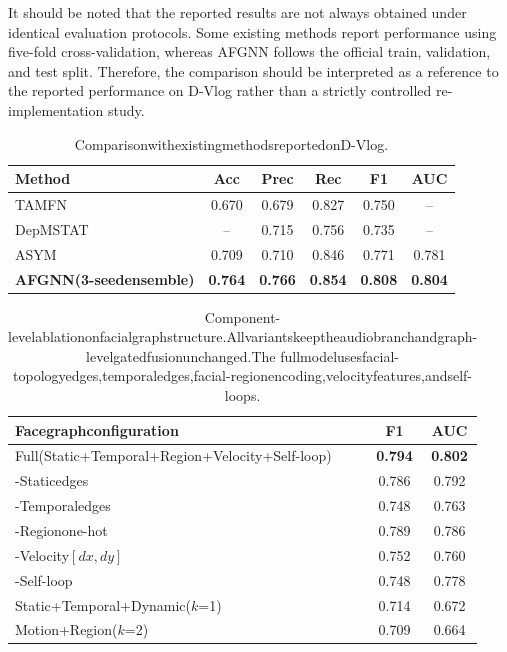 \documentclass[conference]{IEEEtran}
\begin{document}
It should be noted that the reported results are not always obtained under identical evaluation protocols. Some existing methods report performance using five-fold cross-validation, whereas AFGNN follows the official train, validation, and test split. Therefore, the comparison should be interpreted as a reference to the reported performance on D-Vlog rather than a strictly controlled re-implementation study.

\begin{table}[t]
\centering
\caption{ComparisonwithexistingmethodsreportedonD-Vlog.}
\label{tab:sota}
\footnotesize
\setlength{\tabcolsep}{3pt}%
\begin{tabular}{lccccc}
\toprule[1.2pt]
Method&Acc&Prec&Rec&F1&AUC\\
\midrule[0.8pt]
TAMFN~\cite{zhou2023tamfn}&0.670&0.679&0.827&0.750&--\\
DepMSTAT~\cite{tao2024depmstat}&--&0.715&0.756&0.735&--\\
ASYM~\cite{hua2026asym}&0.709&0.710&0.846&0.771&0.781\\
\midrule[0.8pt]
\textbf{AFGNN(3-seedensemble)}&\textbf{0.764}&\textbf{0.766}&\textbf{0.854}&\textbf{0.808}&\textbf{0.804}\\
\bottomrule[1.2pt]
\end{tabular}
\end{table}

\begin{table}[t]
\centering
\caption{Component-levelablationonfacialgraphstructure.Allvariantskeeptheaudiobranchandgraph-levelgatedfusionunchanged.The
fullmodelusesfacial-topologyedges,temporaledges,facial-regionencoding,velocityfeatures,andself-loops.}
\label{tab:graph_ablation}
\small
\begin{tabular}{lcc}
\toprule[1.2pt]
Facegraphconfiguration&F1&AUC\\
\midrule[0.8pt]
Full(Static+Temporal+Region+Velocity+Self-loop)&\textbf{0.794}&\textbf{0.802}\\
\midrule[0.8pt]
-Staticedges&0.786&0.792\\
-Temporaledges&0.748&0.763\\
-Regionone-hot&0.789&0.786\\
-Velocity$[dx,dy]$&0.752&0.760\\
-Self-loop&0.748&0.778\\
\midrule[0.8pt]
Static+Temporal+Dynamic($k$=1)&0.714&0.672\\
Motion+Region($k$=2)&0.709&0.664\\
\bottomrule[1.2pt]
\end{tabular}
\end{table}
\end{document}
